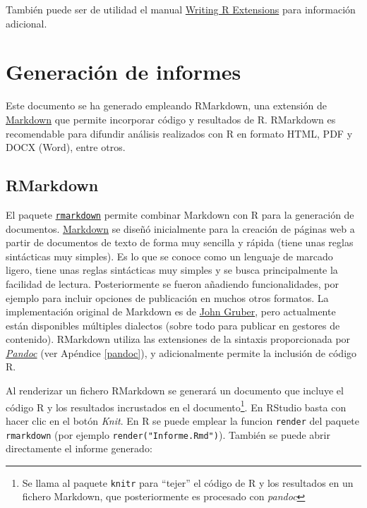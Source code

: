 \documentclass[
]{book}
\theoremstyle{break}
\theoremstyle{nonumberplain}
\begin{document}
También puede ser de utilidad el manual \href{http://colinfay.me/writing-r-extensions}{Writing R Extensions} para información adicional.

\hypertarget{informes}{%
\chapter{Generación de informes}\label{informes}}

Este documento se ha generado empleando RMarkdown, una extensión de \href{https://es.wikipedia.org/wiki/Markdown}{Markdown} que permite incorporar código y resultados de R.
RMarkdown es recomendable para difundir análisis realizados con R en formato HTML, PDF y DOCX (Word), entre otros.

\hypertarget{rmarkdown}{%
\section{RMarkdown}\label{rmarkdown}}

El paquete \href{https://github.com/rstudio/rmarkdown}{\texttt{rmarkdown}} permite combinar Markdown con R para la generación de documentos. \href{http://daringfireball.net/projects/markdown/}{Markdown} se diseñó inicialmente para la creación de páginas web a partir de documentos de texto de forma muy sencilla y rápida (tiene unas reglas sintácticas muy simples).
Es lo que se conoce como un lenguaje de marcado ligero, tiene unas reglas sintácticas muy simples y se busca principalmente la facilidad de lectura.
Posteriormente se fueron añadiendo funcionalidades, por ejemplo para incluir opciones de publicación en muchos otros formatos.
La implementación original de Markdown es de \href{http://daringfireball.net/projects/markdown/}{John Gruber},
pero actualmente están disponibles múltiples dialectos (sobre todo para publicar en gestores de contenido).
RMarkdown utiliza las extensiones de la sintaxis proporcionada por \emph{\href{https://pandoc.org}{Pandoc}} (ver Apéndice \ref{pandoc}), y adicionalmente permite la inclusión de código R.

Al renderizar un fichero RMarkdown se generará un documento que incluye el código R y los resultados incrustados en el documento\footnote{Se llama al paquete \texttt{knitr} para ``tejer'' el código de R y los resultados en un fichero Markdown, que posteriormente es procesado con \emph{pandoc}}.
En RStudio basta con hacer clic en el botón \emph{Knit}.
En R se puede emplear la funcion \texttt{render} del paquete \texttt{rmarkdown} (por ejemplo \texttt{render("Informe.Rmd")}).
También se puede abrir directamente el informe generado:
\end{document}
